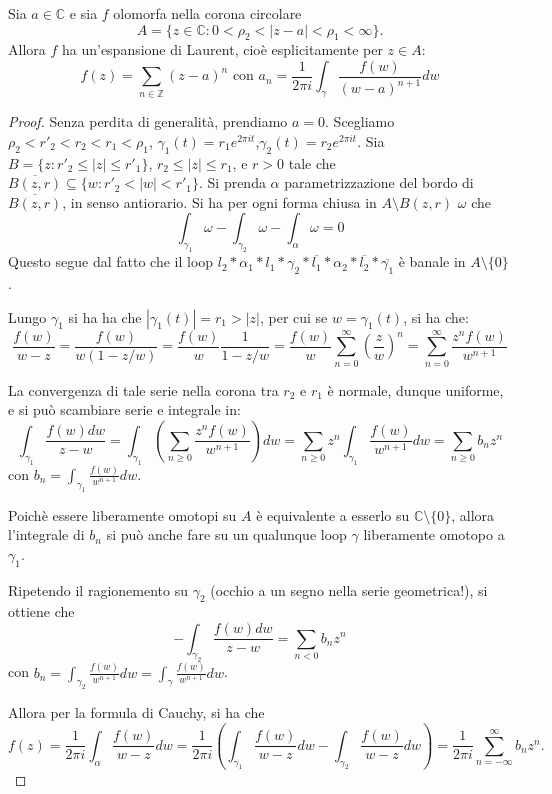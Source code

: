 \begin{thm}
    Sia $a\in\mathbb{C}$ e sia $f$ olomorfa nella corona circolare
    \[
        A = \{z\in\mathbb{C}:0<\rho_2<|z-a|<\rho_1<\infty\}.
    \]
    Allora $f$ ha un'espansione di Laurent, cio\`e esplicitamente per $z\in A$:
    \[
        f(z) = \sum_{n\in\mathbb{Z}}(z-a)^n \text{\ con\ }
        a_n = \frac{1}{2\pi i} \int_\gamma \frac{f(w)}{(w-a)^{n+1}}dw
    \]
\end{thm}
\begin{proof}
    Senza perdita di generalit\`a, prendiamo $a=0$. Scegliamo $\rho_2 <
    r'_2<r_2<r_1<\rho_1$, $\gamma_1(t)=r_1e^{2\pi i t}$,$\gamma_2(t)=r_2e^{2\pi
    i t}$.
    Sia $B=\{z: r'_2\leq |z| \leq r'_1\}$, $r_2\leq |z| \leq r_1$, e $r>0$ tale
    che $\overline{B(z,r)}\subseteq \{w: r'_2<|w|<r'_1\}$. Si prenda $\alpha$
    parametrizzazione del bordo di $\overline{B(z,r)}$, in senso antiorario.
    Si ha per ogni forma chiusa in $A\setminus B(z,r)$ $\omega$ che
    \[
        \int_{\gamma_1}\omega-\int_{\gamma_2}\omega-\int_{\alpha}\omega=0
    \]
    Questo segue dal fatto che il loop $l_2 * \alpha_1 * l_1 * \gamma_2 *
    \overline{l_1} * \alpha_2 * \overline{l_2} * \overline{\gamma_1}$ \`e banale
    in $A\setminus\{0\}$.

    Lungo $\gamma_1$ si ha ha che $|\gamma_1(t)| = r_1 > |z|$, per cui se $w =
    \gamma_1(t)$, si ha che:
    \[
        \frac{f(w)}{w-z} = \frac{f(w)}{w(1-z/w)} = \frac{f(w)}{w}\frac{1}{1-z/w}
        = \frac{f(w)}{w} \sum_{n=0}^\infty \left(\frac{z}{w}\right)^n = 
        \sum_{n=0}^\infty \frac{z^nf(w)}{w^{n+1}}
    \]

    La convergenza di tale serie nella corona tra $r_2$ e $r_1$ \`e normale,
    dunque uniforme, e si pu\`o scambiare serie e integrale in:
    \[
        \int_{\gamma_1} \frac{f(w)dw}{z-w} =
        \int_{\gamma_1} (\sum_{n\geq 0}\frac{z^nf(w)}{w^{n+1}})dw = 
        \sum_{n\geq 0}z^n\int_{\gamma_1} \frac{f(w)}{w^{n+1}}dw = 
        \sum_{n\geq 0}b_n z^n
    \]
    con $b_n=\int_{\gamma_1} \frac{f(w)}{w^{n+1}}dw$.

    Poich\`e essere liberamente omotopi su $A$ \`e equivalente a esserlo su
    $\mathbb{C}\setminus\{0\}$, allora l'integrale di $b_n$ si pu\`o anche fare
    su un qualunque loop $\gamma$ liberamente omotopo a $\gamma_1$.

    Ripetendo il ragionemento su $\gamma_2$ (occhio a un segno nella serie
    geometrica!), si ottiene che
    \[
        -\int_{\gamma_2} \frac{f(w)dw}{z-w} =
        \sum_{n< 0}b_n z^n
    \]
    con $b_n =\int_{\gamma_2} \frac{f(w)}{w^{n+1}}dw = \int_\gamma
    \frac{f(w)}{w^{n+1}}dw$.

    Allora per la  formula di Cauchy, si ha che
    \[
        f(z) = \frac{1}{2\pi i} \int_\alpha \frac{f(w)}{w-z} dw = 
        \frac{1}{2\pi i}( \int_{\gamma_1} \frac{f(w)}{w-z} dw - 
        \int_{\gamma_2} \frac{f(w)}{w-z} dw) = \frac{1}{2\pi i}
        \sum_{n=-\infty}^\infty b_n z^n.
    \]
\end{proof}

